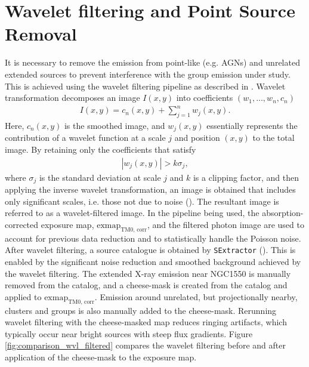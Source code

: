 \section{Wavelet filtering and Point Source Removal}
It is necessary to remove the emission from point-like (e.g. AGNs) and unrelated extended sources to prevent interference with the group emission under study. This is achieved using the wavelet filtering pipeline as described in \citep{Pacaud2006}. Wavelet transformation decomposes an image \(I(x, y)\) into coefficients \((w_1, \ldots, w_n, c_n)\)
\begin{align*}
I(x, y) = c_n(x, y) + \sum_{j=1}^{n}w_j(x, y).    
\end{align*}
Here, \(c_n(x, y)\) is the smoothed image, and \(w_j(x, y)\) essentially represents the contribution of a wavelet function at a scale \(j\) and position \((x, y)\) to the total image. By retaining only the coefficients that satisfy
\begin{align*}
|w_j(x, y)| > k\sigma_j,
\end{align*}
where \(\sigma_j\) is the standard deviation at scale \(j\) and \(k\) is a clipping factor, and then applying the inverse wavelet transformation, an image is obtained that includes only significant scales, i.e. those not due to noise (\cite{Stark1998}). The resultant image is referred to as a wavelet-filtered image. In the pipeline being used, the absorption-corrected exposure map, \(\text{exmap}_\text{TM0, corr}\), and the filtered photon image are used to account for previous data reduction and to statistically handle the Poisson noise. After wavelet filtering, a source catalogue is obtained by \texttt{SExtractor} (\cite{Bertin1996}). This is enabled by the significant noise reduction and smoothed background achieved by the wavelet filtering. The extended X-ray emission near NGC1550 is manually removed from the catalog, and a cheese-mask is created from the catalog and applied to \(\text{exmap}_\text{TM0, corr}\). Emission around unrelated, but projectionally nearby, clusters and groups is also manually added to the cheese-mask. Rerunning wavelet filtering with the cheese-masked map reduces ringing artifacts, which typically occur near bright sources with steep flux gradients. Figure \ref{fig:comparison_wvl_filtered} compares the wavelet filtering before and after application of the cheese-mask to the exposure map.
%
